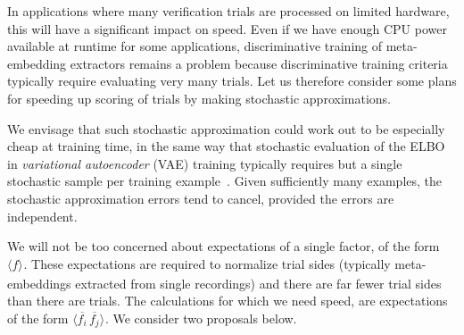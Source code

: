 \documentclass[a4paper,oneside,12pt,english]{report}
\def\expv#1#2{\bigl\langle#1\bigr\rangle_{#2}}
\def\normal#1{\overline{#1}}
\begin{document}
In applications where many verification trials are processed on limited hardware, this will have a significant impact on speed. Even if we have enough CPU power available at runtime for some applications, discriminative training of meta-embedding extractors remains a problem because discriminative training criteria typically require evaluating very many trials. Let us therefore consider some plans for speeding up scoring of trials by making stochastic approximations.

We envisage that such stochastic approximation could work out to be especially cheap at training time, in the same way that stochastic evaluation of the ELBO in \emph{variational autoencoder} (VAE) training typically requires but a single stochastic sample per training example~\cite{VAE}. Given sufficiently many examples, the stochastic approximation errors tend to cancel, provided the errors are independent. 

We will not be too concerned about expectations of a single factor, of the form $\expv{f}{}$. These expectations are required to normalize trial sides (typically meta-embeddings extracted from single recordings) and there are far fewer trial sides than there are trials. The calculations for which we need speed, are expectations of the form $\expv{\normal{f_i}\,\normal{f_j}}{}$. We consider two proposals below.
\end{document}
